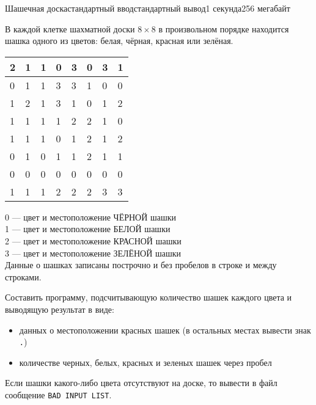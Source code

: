 \begin{problem}{Шашечная доска}{стандартный ввод}{стандартный вывод}{1 секунда}{256 мегабайт}

В каждой клетке шахматной доски $8 \times 8$ в произвольном порядке находится шашка одного из цветов: белая, чёрная, красная или зелёная.

\begin{tabular}{| l | l | l | l | l | l | l | l |}
    \hline
    2 & 1 & 1 & 0 & 3 & 0 & 3 & 1 \\ \hline
    0 & 1 & 1 & 3 & 3 & 1 & 0 & 0 \\ \hline
    1 & 2 & 1 & 3 & 1 & 0 & 1 & 2 \\ \hline
    1 & 1 & 1 & 1 & 2 & 2 & 1 & 0 \\ \hline
    1 & 1 & 1 & 0 & 1 & 2 & 1 & 2 \\ \hline
    0 & 1 & 0 & 1 & 1 & 2 & 1 & 1 \\ \hline
    0 & 0 & 0 & 0 & 0 & 0 & 0 & 0 \\ \hline
    1 & 1 & 1 & 2 & 2 & 2 & 3 & 3 \\ \hline
\end{tabular}

0 --- цвет и местоположение ЧЁРНОЙ шашки \\
1 --- цвет и местоположение БЕЛОЙ шашки \\
2 --- цвет и местоположение КРАСНОЙ шашки \\
3 --- цвет и местоположение ЗЕЛЁНОЙ шашки \\

\InputFile
Данные о шашках записаны построчно и без пробелов в строке и между строками.

\OutputFile
Составить программу, подсчитывающую количество шашек каждого цвета и выводящую результат в виде:
\begin{itemize}
\item данных о местоположении красных шашек (в остальных местах вывести знак \texttt{.})
\item количестве черных, белых, красных и зеленых шашек через пробел
\end{itemize}
Если шашки какого-либо цвета отсутствуют на доске, то вывести в файл сообщение \texttt{BAD INPUT LIST}.

\Example

\begin{example}
%
\end{example}

\end{problem}

